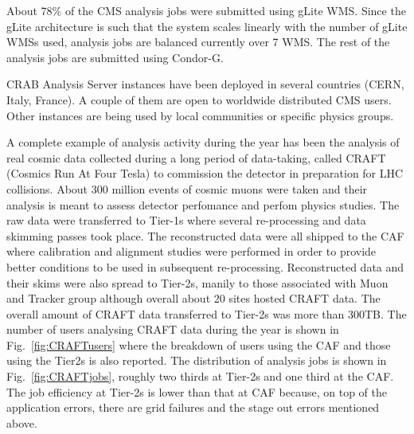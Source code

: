 About 78\% of the CMS analysis jobs were submitted using gLite WMS.  Since the gLite architecture is such that the system scales linearly with the number of gLite WMSs used, analysis jobs are balanced currently over 7 WMS. The rest of the analysis jobs are submitted using Condor-G.

CRAB Analysis Server instances have been deployed in several countries (CERN, Italy, France). A couple of them are open to worldwide distributed CMS users. Other instances are being used by local communities or specific physics groups.

A complete example of analysis activity during the year has been the analysis 
of real cosmic data collected during a long period of data-taking, called CRAFT (Cosmics Run At Four Tesla) to commission the detector in preparation for LHC collisions. About 300 million events of cosmic muons were taken and their analysis is meant to assess detector perfomance and perfom physics studies.
The raw data were transferred to Tier-1s where several re-processing and data skimming passes took place. The reconstructed data were all shipped to the CAF where calibration and alignment studies were performed in order to provide better conditions to be used in subsequent re-processing. 
Reconstructed data and their skims were also spread to Tier-2s, manily to 
those associated with Muon and Tracker group although overall about 20 sites hosted CRAFT data. The overall amount of CRAFT data transferred to Tier-2s was more than 300TB.
The number of users analysing CRAFT data during the year is shown in Fig.~\ref{fig:CRAFTusers} where the breakdown of users using the CAF and those using the Tier2s is also reported. The distribution of analysis jobs is shown in Fig.~\ref{fig:CRAFTjobs}, roughly two thirds at Tier-2s and one third at the CAF.
The job efficiency at Tier-2s is lower than that at CAF because, on top of the application errors, there are grid failures and the stage out errors mentioned above.
